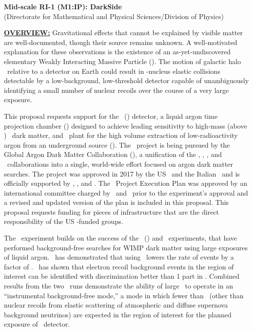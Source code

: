 \label{sec:ProjectSummary}

\begin{center}
{\bf Mid-scale RI-1 (M1:IP): DarkSide} \\
(Directorate for Mathematical and Physical Sciences/Division of Physics)
\end{center}
\vspace*{-3.5mm}
{\underline {\bf OVERVIEW:}}
Gravitational effects that cannot be explained by visible matter are well-documented, though their source remains unknown.  A well-motivated explanation for these observations is the existence of an as-yet-undiscovered elementary Weakly Interacting Massive Particle (\WIMP).  The motion of galactic halo \WIMPs\ relative to a detector on Earth could result in \WIMP-nucleus elastic collisions detectable by a low-background, low-threshold detector capable of unambiguously identifying a small number of nuclear recoils over the course of a very large exposure.

This proposal requests support for the \DSk\ (\DSks) detector, a liquid argon time projection chamber (\LArTPC) designed to achieve leading sensitivity to high-mass (above \DSkHighMassThreshold) \WIMP\ dark matter, and \Urania\ plant  for the high volume extraction of low-radioactivity argon from an underground source (\UAr). The \DSk\ project is being pursued by the Global Argon Dark Matter Collaboration (\GADMC), a unification of the \DS, \DEAP, \mCLEAN, and \ArDM\ collaborations into a single, world-wide effort focused on argon dark matter searches. The project was approved in 2017 by the US \NSF\ and the Italian \INFN\ and is officially supported by \LNGS, \LSC, and \SNOLAB.  The \DSks\ Project Execution Plan was approved by an international committee charged by \INFN\ and \NSF\ prior to the experiment's approval and a revised and updated version of the plan is included in this proposal. This proposal requests funding for pieces of infrastructure that are the direct responsibility of the US \NSF-funded groups. 

The \DSks\ experiment builds on the success of the \DSf\ (\DSfs) and \DEAP\ experiments, that have performed background-free searches for WIMP dark matter using large exposures of liquid argon.  \DSfs\ has demonstrated that using \UAr\ lowers the rate of  events by a factor of \DSkDArThreeNineDepletion. \DEAP\ has shown that electron recoil background events in the region of interest can be identified with discrimination better than 1 part in \DEAPPSDRejection. Combined results from the two \DSfs\ runs demonstrate the ability of large \LArTPCs\ to operate in an ``instrumental background-free  mode,'' a mode in which fewer than \BackgroundFreeRequirement\ (other than nuclear recoils from elastic scattering of atmospheric and diffuse supernova background neutrinos) are expected in the region of interest for the planned exposure of \DSks\ detector.

